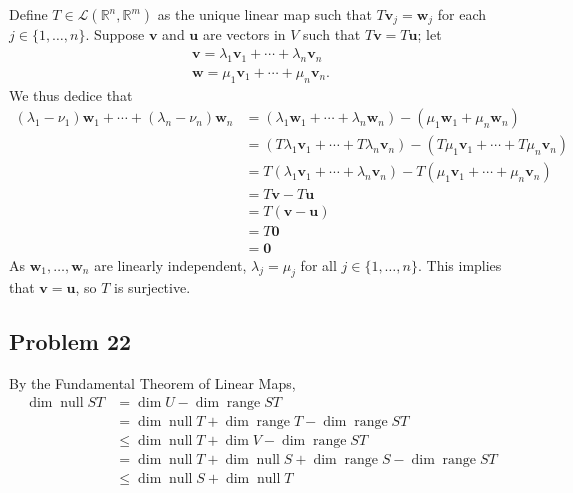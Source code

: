 \documentclass[11pt]{article}
\renewcommand{\vec}[1]{\mathbf{#1}}
\begin{document}
Define $T \in \mathcal{L}(\mathbb{R}^{n}, \mathbb{R}^{m})$ as the unique linear map such that $T \vec{v}_{j} = \vec{w}_{j}$ for each $j \in \{ 1, \ldots, n \}$. Suppose $\vec{v}$ and $\vec{u}$ are vectors in $V$ such that $T \vec{v} = T \vec{u}$; let 
\begin{align*}
	\vec{v} = \lambda_{1} \vec{v}_{1} + \cdots + \lambda_{n} \vec{v}_{n} \\
	\vec{w} = \mu_{1} \vec{v}_{1} + \cdots + \mu_{n} \vec{v}_{n}.
\end{align*}
We thus dedice that
\begin{align*}
	(\lambda_{1} - \nu_{1}) \vec{w}_{1} + \cdots + (\lambda_{n} - \nu_{n}) \vec{w}_{n} &= (\lambda_{1} \vec{w}_{1} + \cdots + \lambda_{n} \vec{w}_{n}) - (\mu_{1} \vec{w}_{1} + \mu_{n} \vec{w}_{n}) \\
	&= (T \lambda_{1} \vec{v}_{1} + \cdots + T \lambda_{n} \vec{v}_{n}) - (T \mu_{1} \vec{v}_{1} + \cdots + T \mu_{n} \vec{v}_{n}) \\
	&= T(\lambda_{1} \vec{v}_{1} + \cdots + \lambda_{n} \vec{v}_{n}) - T(\mu_{1} \vec{v}_{1} + \cdots + \mu_{n} \vec{v}_{n}) \\
	&= T\vec{v} - T \vec{u} \\
	&= T(\vec{v} - \vec{u}) \\
	&= T \vec{0} \\
	&= \vec{0}
\end{align*}
As $\vec{w}_{1}, \ldots, \vec{w}_{n}$ are linearly independent, $\lambda_{j} = \mu_{j}$ for all $j \in \{ 1, \ldots, n \}$. This implies that $\vec{v} = \vec{u}$, so $T$ is surjective.


\subsection{Problem 22}

By the Fundamental Theorem of Linear Maps,
\begin{align*}
	\dim \operatorname{null} ST &= \dim U - \dim \operatorname{range} ST \\
	&= \dim \operatorname{null} T + \dim \operatorname{range} T - \dim \operatorname{range} ST \\
	&\le \dim \operatorname{null} T + \dim V - \dim \operatorname{range} ST \\
	&= \dim \operatorname{null} T + \dim \operatorname{null} S + \dim \operatorname{range} S - \dim \operatorname{range} ST \\
	&\le \dim \operatorname{null} S + \dim \operatorname{null} T
\end{align*}
\end{document}
